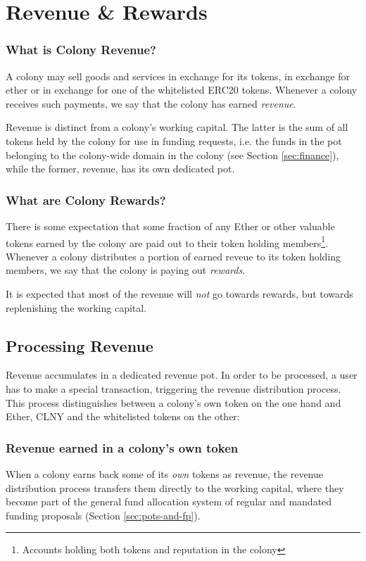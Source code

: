 \section{Revenue \& Rewards}\label{sec:revenue}

\subsubsection*{What is Colony Revenue?}
A colony may sell goods and services in exchange for its tokens, in exchange for ether or in exchange for one of the whitelisted ERC20 tokens. Whenever a colony receives such payments, we say that the colony has earned \emph{revenue}.

Revenue is distinct from a colony's working capital. The latter is the sum of all tokens held by the colony for use in funding requests, i.e. the funds in the pot belonging to the colony-wide domain in the colony (see Section \ref{sec:finance}), while the former, revenue, has its own dedicated pot.

\subsubsection*{What are Colony Rewards?}
There is some expectation that some fraction of any Ether or other valuable tokens earned by the colony are paid out to their token holding members\footnote{Accounts holding both tokens and reputation in the colony}. Whenever a colony distributes a portion of earned reveue to its token holding members, we say that the colony is paying out \emph{rewards}.

It is expected that most of the revenue will \emph{not} go towards rewards, but towards replenishing the working capital.

\subsection{Processing Revenue}
Revenue accumulates in a dedicated revenue pot. In order to be processed, a user has to make a special transaction, triggering the revenue distribution process. This process distinguishes between a colony's own token on the one hand and Ether, CLNY and the whitelisted tokens on the other:

\subsubsection*{Revenue earned in a colony's own token}
When a colony earns back some of its \emph{own} tokens as revenue, the revenue distribution process transfers them directly to the working capital, where they become part of the general fund allocation system of regular and mandated funding proposals (Section \ref{sec:pots-and-fp}).

